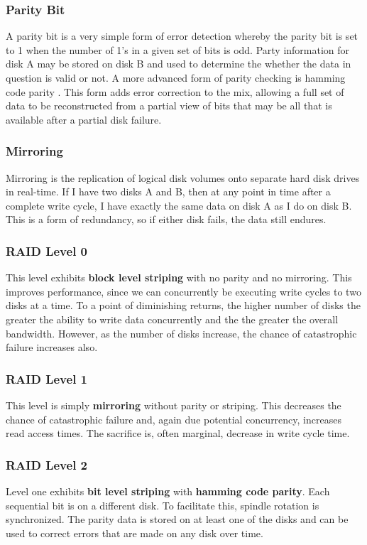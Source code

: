 \documentclass[10pt,a4paper]{article}
\begin{document}
\subsubsection{Parity Bit}
A parity bit is a very simple form of error detection whereby the parity bit is set to 1 when the number of 1's in a given set of bits is odd. Party information for disk A may be stored on disk B and used to determine the whether the data in question is valid or not. A more advanced form of parity checking is hamming code parity \cite{HAMMINGCODE}. This form adds error correction to the mix, allowing a full set of data to be reconstructed from a partial view of bits that may be all that is available after a partial disk failure. 
\subsubsection{Mirroring}
Mirroring is the replication of logical disk volumes onto separate hard disk drives in real-time. If I have two disks A and B, then at any point in time after a complete write cycle, I have exactly the same data on disk A as I do on disk B. This is a form of redundancy, so if either disk fails, the data still endures. 
\subsubsection{RAID Level 0}
This level exhibits {\bf block level striping} with no parity and no mirroring. This improves performance, since we can concurrently be executing write cycles to two disks at a time. To a point of diminishing returns, the higher number of disks the greater the ability to write data concurrently and the the greater the overall bandwidth. However, as the number of disks increase, the chance of catastrophic failure increases also. 
\subsubsection{RAID Level 1}
This level is simply {\bf mirroring} without parity or striping. This decreases the chance of catastrophic failure and, again due potential concurrency, increases read access times. The sacrifice is, often marginal, decrease in write cycle time. 
\subsubsection{RAID Level 2}
Level one exhibits {\bf bit level striping} with {\bf hamming code parity}. Each sequential bit is on a different disk. To facilitate this, spindle rotation is synchronized. The parity data is stored on at least one of the disks and can be used to correct errors that are made on any disk over time. 
\end{document}
